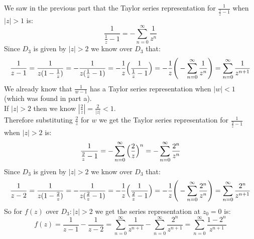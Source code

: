 \documentclass{article}
\begin{document}
\begin{center}
    \doublespacing
    We saw in the previous part that the Taylor series representation for $\frac{1}{\frac{1}{z} - 1}$ when $|z| > 1$ is:
    \[\frac{1}{\frac{1}{z} - 1} = -\sum _{n=0}^{\infty}\frac{1}{z^n}\]
    Since $D_3$ is given by $|z| > 2$ we know over $D_3$ that:
    \[\frac{1}{z - 1} =\frac{1}{z(1 -\frac{1}{z})} = -\frac{1}{z(\frac{1}{z} - 1)} = -\frac{1}{z}\Big{(}\frac{1}{\frac{1}{z} - 1}\Big{)} = -\frac{1}{z}\Bigg{(}-\sum _{n=0}^{\infty}\frac{1}{z^n}\Bigg{)} =\sum _{n=0}^{\infty}\frac{1}{z^{n+1}}\]
    We already know that $\frac{1}{w - 1}$ has a Taylor series representation when $|w| < 1$ (which was found in part a).
    \\If $|z| > 2$ then we know $|\frac{2}{z}| =\frac{2}{|z|} < 1$.
    \\Therefore substituting $\frac{2}{z}$ for $w$ we get the Taylor series representation for $\frac{1}{\frac{2}{z} - 1}$ when $|z| > 2$ is:
    \[\frac{1}{\frac{2}{z} - 1} = -\sum _{n=0}^{\infty} \Big{(}\frac{2}{z}\Big{)}^n = -\sum _{n=0}^{\infty}\frac{2^n}{z^n}\]
    Since $D_3$ is given by $|z| > 2$ we know over $D_3$ that:
    \[\frac{1}{z - 2} =\frac{1}{z(1 -\frac{2}{z})} = -\frac{1}{z(\frac{2}{z} - 1)} = -\frac{1}{z}\Big{(}\frac{1}{\frac{2}{z} - 1}\Big{)} = -\frac{1}{z}\Bigg{(}-\sum _{n=0}^{\infty}\frac{2^n}{z^n}\Bigg{)} =\sum _{n=0}^{\infty}\frac{2^n}{z^{n+1}}\]
    So for $f(z)$ over $D_3: |z| > 2$ we get the series representation at $z_0 = 0$ is:
    \[f(z) =\frac{1}{z - 1} -\frac{1}{z - 2} =\sum _{n=0}^{\infty}\frac{1}{z^{n+1}} -\sum _{n=0}^{\infty}\frac{2^n}{z^{n+1}} =\sum _{n=0}^{\infty}\frac{1 - 2^n}{z^{n+1}}\]
\end{center}
\end{document}
